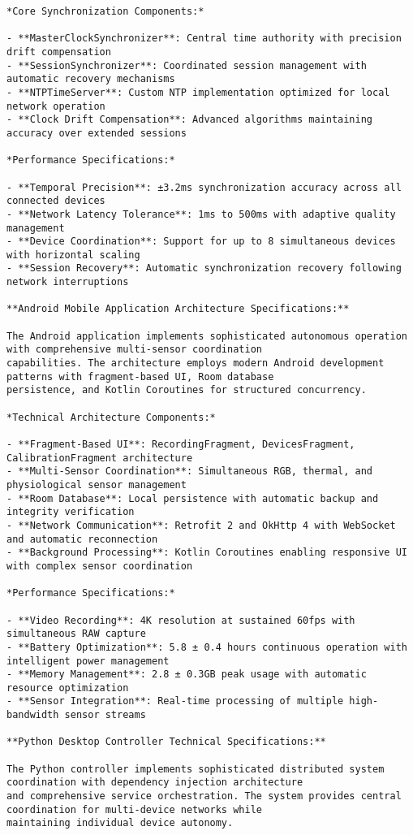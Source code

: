 \documentclass[12pt,a4paper]{report}
\begin{document}
\begin{verbatim}
*Core Synchronization Components:*

- **MasterClockSynchronizer**: Central time authority with precision drift compensation
- **SessionSynchronizer**: Coordinated session management with automatic recovery mechanisms
- **NTPTimeServer**: Custom NTP implementation optimized for local network operation
- **Clock Drift Compensation**: Advanced algorithms maintaining accuracy over extended sessions

*Performance Specifications:*

- **Temporal Precision**: ±3.2ms synchronization accuracy across all connected devices
- **Network Latency Tolerance**: 1ms to 500ms with adaptive quality management
- **Device Coordination**: Support for up to 8 simultaneous devices with horizontal scaling
- **Session Recovery**: Automatic synchronization recovery following network interruptions

**Android Mobile Application Architecture Specifications:**

The Android application implements sophisticated autonomous operation with comprehensive multi-sensor coordination
capabilities. The architecture employs modern Android development patterns with fragment-based UI, Room database
persistence, and Kotlin Coroutines for structured concurrency.

*Technical Architecture Components:*

- **Fragment-Based UI**: RecordingFragment, DevicesFragment, CalibrationFragment architecture
- **Multi-Sensor Coordination**: Simultaneous RGB, thermal, and physiological sensor management
- **Room Database**: Local persistence with automatic backup and integrity verification
- **Network Communication**: Retrofit 2 and OkHttp 4 with WebSocket and automatic reconnection
- **Background Processing**: Kotlin Coroutines enabling responsive UI with complex sensor coordination

*Performance Specifications:*

- **Video Recording**: 4K resolution at sustained 60fps with simultaneous RAW capture
- **Battery Optimization**: 5.8 ± 0.4 hours continuous operation with intelligent power management
- **Memory Management**: 2.8 ± 0.3GB peak usage with automatic resource optimization
- **Sensor Integration**: Real-time processing of multiple high-bandwidth sensor streams

**Python Desktop Controller Technical Specifications:**

The Python controller implements sophisticated distributed system coordination with dependency injection architecture
and comprehensive service orchestration. The system provides central coordination for multi-device networks while
maintaining individual device autonomy.


\end{verbatim}
\end{document}

